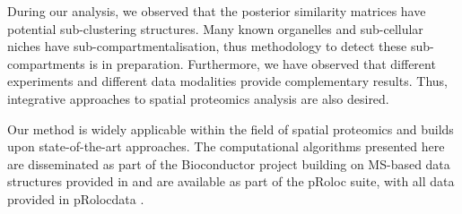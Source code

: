 \documentclass[12pt,english]{article}
\begin{document}
During our analysis, we observed that the posterior similarity matrices have potential sub-clustering structures. Many known organelles and sub-cellular niches have sub-compartmentalisation, thus methodology to detect these sub-compartments is in preparation. Furthermore, we have observed that different experiments and different data modalities provide complementary results. Thus, integrative approaches to spatial proteomics analysis are also desired. 

Our method is widely applicable within the field of spatial proteomics and builds upon state-of-the-art approaches. The computational algorithms presented here are disseminated as part of the Bioconductor project \citep{Bioconductor::2004, Huber:2015} building on MS-based data structures provided in \cite{MSnbase:2012} and are available as part of the pRoloc suite, with all data provided in pRolocdata \citep{pRoloc:2014}.


%
\end{document}
